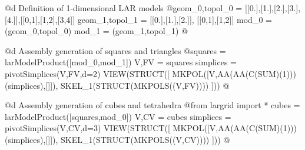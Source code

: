 \documentclass[11pt,oneside]{article}	%
\begin{document}
@d Definition of 1-dimensional LAR models 
@{geom_0,topol_0 = [[0.],[1.],[2.],[3.],[4.]],[[0,1],[1,2],[3,4]]
geom_1,topol_1 = [[0.],[1.],[2.]], [[0,1],[1,2]]
mod_0 = (geom_0,topol_0)
mod_1 = (geom_1,topol_1)
@}

@d Assembly generation of squares and triangles
@{squares = larModelProduct([mod_0,mod_1])
V,FV = squares
simplices = pivotSimplices(V,FV,d=2)
VIEW(STRUCT([ MKPOL([V,AA(AA(C(SUM)(1)))(simplices),[]]),
              SKEL_1(STRUCT(MKPOLS((V,FV)))) ]))
@}

@d Assembly generation  of cubes and tetrahedra 
@{from largrid import *
cubes = larModelProduct([squares,mod_0])
V,CV = cubes
simplices = pivotSimplices(V,CV,d=3)
VIEW(STRUCT([ MKPOL([V,AA(AA(C(SUM)(1)))(simplices),[]]),
			  SKEL_1(STRUCT(MKPOLS((V,CV)))) ]))
@}









\end{document}
